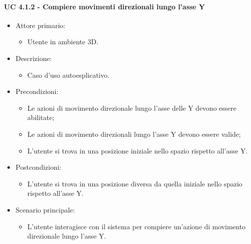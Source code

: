 \paragraph{UC 4.1.2 - Compiere movimenti direzionali lungo l'asse Y}
\begin{itemize}

	\item Attore primario: 
	\begin{itemize}
		\item Utente in ambiente 3D.
	\end{itemize}
	\item Descrizione:
	\begin{itemize}
		\item Caso d'uso autoesplicativo.
	\end{itemize}
	
	\item Precondizioni:
	\begin{itemize}
		\item Le azioni di movimento direzionale lungo l'asse delle Y devono essere abilitate;
		\item Le azioni di movimento direzionali lungo l'asse Y devono essere valide;
		\item L'utente si trova in una posizione iniziale nello spazio rispetto all'asse Y.
	\end{itemize}
	
	\item Postcondizioni:
	\begin{itemize}
		\item L'utente si trova in una posizione diversa da quella iniziale nello spazio rispetto all'asse Y.
	\end{itemize}
	
	\item Scenario principale:
	\begin{itemize}
		\item L'utente interagisce con il sistema per compiere un'azione di movimento direzionale lungo l'asse Y.
	\end{itemize}
	
\end{itemize}

